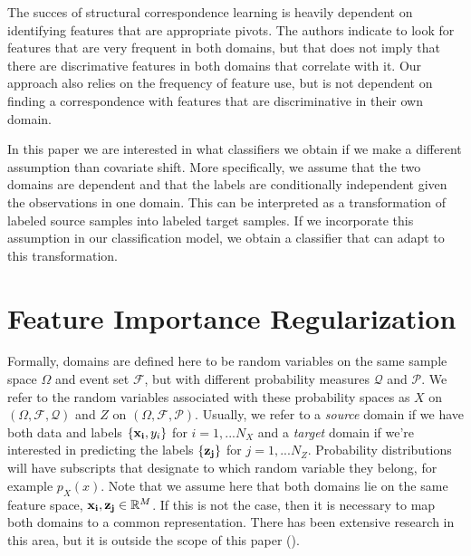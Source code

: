\documentclass[twoside,11pt]{article}
\begin{document}
The succes of structural correspondence learning is heavily dependent on identifying features that are appropriate pivots. The authors indicate to look for features that are very frequent in both domains, but that does not imply that there are discrimative features in both domains that correlate with it. Our approach also relies on the frequency of feature use, but is not dependent on finding a correspondence with features that are discriminative in their own domain.

In this paper we are interested in what classifiers we obtain if we make a different assumption than covariate shift. More specifically, we assume that the two domains are dependent and that the labels are conditionally independent given the observations in one domain. This can be interpreted as a transformation of labeled source samples into labeled target samples. If we incorporate this assumption in our classification model, we obtain a classifier that can adapt to this transformation.

\section{Feature Importance Regularization}
Formally, domains are defined here to be random variables on the same sample space $\Omega$ and event set $\mathcal{F}$, but with different probability measures $\mathcal{Q}$ and $\mathcal{P}$. We refer to the random variables associated with these probability spaces as $X$ on $(\Omega, \mathcal{F}, \mathcal{Q})$ and ${Z}$ on $(\Omega, \mathcal{F}, \mathcal{P})$. Usually, we refer to a \emph{source} domain if we have both data and labels $\{{\bf x_{i}}, y_{i}\}$ for  $i = 1,...N_{X}$ and a \emph{target} domain if we're interested in predicting the labels $\{{\bf z_{j}}\}$ for $j = 1,...N_{Z}$. Probability distributions will have subscripts that designate to which random variable they belong, for example $p_{X}(x)$. Note that we assume here that both domains lie on the same feature space, ${\bf x_{i}, z_{j}} \in \mathbb{R}^{M}$. If this is not the case, then it is necessary to map both domains to a common representation. There has been extensive research in this area, but it is outside the scope of this paper (\citealp{ben2007analysis, shao2014generalized}). 
\end{document}
